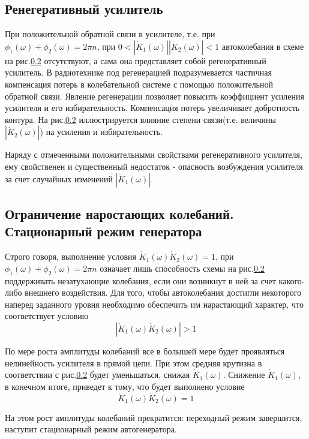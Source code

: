 \subsection{Ренегеративный усилитель}
При положительной обратной связи в усилителе, т.е. при $\phi_1(\omega)+\phi_2(\omega)=2\pi n$, при $0<|\dot{K}_1(\omega)||\dot{K}_2(\omega)|<1$ автоколебания в схеме на рис.\ref{} отсутствуют, а сама она представляет собой регенеративный усилитель. В радиотехнике под регенерацией подразумевается частичная компенсация потерь в колебательной системе с помощью положительной обратной связи. Явление регенерации позволяет повысить коэффициент усиления усилителя и его избирательность. Компенсация потерь увеличивает добротность контура. На рис.\ref{} иллюстрируется влияние степени связи(т.е. величины $|\dot{K}_2(\omega)|$) на усиления и избирательность.

Наряду с отмеченными положительными свойствами регенеративного усилителя, ему свойственен и существенный недостаток - опасность возбуждения усилителя за счет случайных изменений $|\dot{K}_1(\omega)|$.
\subsection{Ограничение наростающих колебаний. Стационарный режим генератора} 
Строго говоря, выполнение условия $\dot{K}_1(\omega)\dot{K}_2(\omega)=1$, при $\phi_1(\omega)+\phi_2(\omega)=2\pi n$ означает лишь способность схемы на рис.\ref{} поддерживать незатухающие колебания, если они возникнут в ней за счет какого-либо внешнего воздействия. Для того, чтобы автоколебания достигли некоторого наперед заданного уровня необходимо обеспечить им нарастающий характер, что соответствует условию
\begin{equation*}
|\dot{K}_1(\omega)\dot{K}_2(\omega)|>1
\end{equation*}

По мере роста амплитуды колебаний все в болышей мере будет проявляться нелинейность усилителя в прямой цепи. При этом средняя крутизна в соответствии с рис.\ref{} будет уменьшаться, снижая $\dot{K}_1(\omega)$. Снижение $\dot{K}_1(\omega)$, в конечном итоге, приведет к тому, что будет выполнено условие
\begin{equation*}
\dot{K}_1(\omega)\dot{K}_2(\omega)=1
\end{equation*}

На этом рост амплитуды колебаний прекратится: переходный режим завершится, наступит стационарный режим автогенератора.

